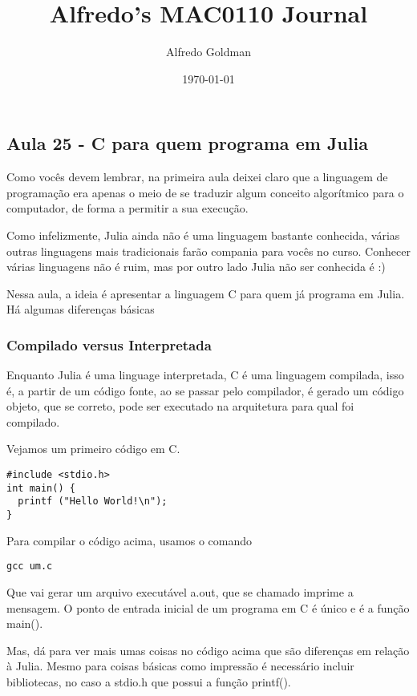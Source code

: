 \documentclass[a4paper]{article}
\author{Alfredo Goldman}
\date{\today}
\title{Alfredo's MAC0110 Journal}
\begin{document}
\maketitle



\subsection{Aula 25 - C para quem programa em Julia}
\label{sec:org901a189}

Como vocês devem lembrar, na primeira aula deixei claro que a linguagem de programação
era apenas o meio de se traduzir algum conceito algorítmico para o computador, de forma
a permitir a sua execução.

Como infelizmente, Julia ainda não é uma linguagem bastante conhecida, várias outras
linguagens mais tradicionais farão compania para vocês no curso. Conhecer várias linguagens
não é ruim, mas por outro lado Julia não ser conhecida é :)

Nessa aula, a ideia é apresentar a linguagem C para quem já programa em Julia. Há algumas
diferenças básicas

\subsubsection{Compilado versus Interpretada}
\label{sec:orgd0dccb9}
 Enquanto Julia é uma linguage interpretada, C é uma linguagem compilada, isso é, a partir
de um código fonte, ao se passar pelo compilador, é gerado um código objeto, que se correto,
pode ser executado na arquitetura para qual foi compilado.

Vejamos um primeiro código em C.
\begin{verbatim}
#include <stdio.h>
int main() {
  printf ("Hello World!\n");
}
\end{verbatim}

Para compilar o código acima, usamos o comando

\begin{verbatim}
gcc um.c
\end{verbatim}
Que vai gerar um arquivo executável a.out, que se chamado imprime
a mensagem. O ponto de entrada inicial de um programa em C é único
e é a função main().

Mas, dá para ver mais umas coisas no código acima que são diferenças
em relação à Julia. Mesmo para coisas básicas como impressão é necessário
incluir bibliotecas, no caso a stdio.h que possui a função printf().
\end{document}
